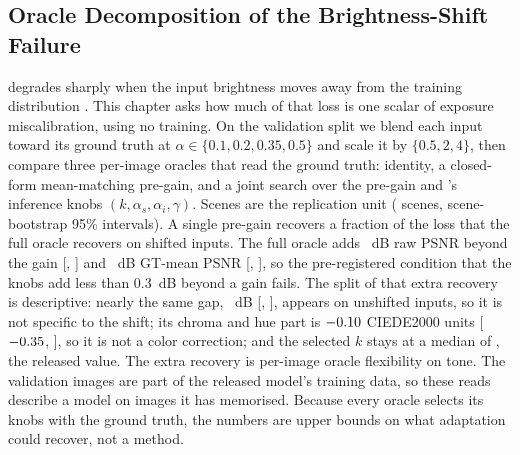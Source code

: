 \subsection{Oracle Decomposition of the Brightness-Shift Failure}
\label{sec:app-s4}

\mname degrades sharply when the input brightness moves away from the training distribution
\citep{pilligua2025mill}. This chapter asks how much of that loss is one scalar of exposure
miscalibration, using no training. On the validation split we blend each input toward its
ground truth at $\alpha \in \{0.1, 0.2, 0.35, 0.5\}$ and scale it by $\{0.5, 2, 4\}$, then
compare three per-image oracles that read the ground truth: identity, a closed-form
mean-matching pre-gain, and a joint search over the pre-gain and \mname's inference knobs
$(k, \alpha_s, \alpha_i, \gamma)$. Scenes are the replication unit ( scenes, scene-bootstrap 95\% intervals).
A single pre-gain recovers a fraction  of the loss that the full oracle recovers
on shifted inputs. The full oracle adds ~dB raw PSNR beyond the gain
[, ] and ~dB GT-mean PSNR [, ], so the
pre-registered condition that the knobs add less than $0.3$~dB beyond a gain fails.
The split of that extra recovery is descriptive: nearly the same gap, ~dB
[, ], appears on unshifted inputs, so it is not specific to the shift;
its chroma and hue part is $-0.10$ CIEDE2000 units [$-0.35$, ], so it
is not a color correction; and the selected $k$ stays at a median of , the
released value. The extra recovery is per-image oracle flexibility on tone. The validation
images are part of the released model's training data, so these reads describe a model on
images it has memorised. Because every oracle selects its knobs with the ground truth, the
numbers are upper bounds on what adaptation could recover, not a method.
